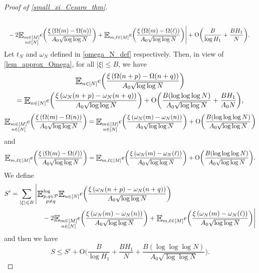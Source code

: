 \documentclass[letter,11pt]{article}
\theoremstyle{plain} %
\theoremstyle{definition} %
\theoremstyle{plain}
\theoremstyle{plain}
\theoremstyle{plain}
\numberwithin{equation}{section}
\newcommand{\Oh}{{\mathrm O}}
\renewcommand{\leq}{\leqslant}
\newcommand{\E}{\raisebox{-0.4ex}{\scalebox{1.4}[1.3]{$\mathbb{E}$}}}
\newcommand{\Esub}[1]{\raisebox{-0.4ex}{\scalebox{1.4}[1.3]{$\mathbb{E}$}}\raisebox{-0.35ex}{\ensuremath{_{\scriptstyle #1}}}}
\newcommand{\logE}{{\E}^{\log}}
\newcommand{\1}{\mathbbm{1}}
\newcommand{\Pc}{\mathcal{P}}
\begin{document}
\begin{proof}[Proof of \cref{small_xi_Cesaro_thm}]
\begin{align*}
\\
& \hspace*{0.2cm} - 2\Esub{\substack{m\in[M] \\ n\in[N]}}e\bigg(\frac{\xi\left(\Omega(m)-\Omega(n)\right)}{A_0\sqrt{\log\log{N}}}\bigg) + \Esub{m,\ell\in[M]} e\bigg(\frac{\xi \left(\Omega(m)-\Omega(\ell)\right)}{A_0 \sqrt{\log\log{N}}}\bigg)\Bigg|
+ \Oh\bigg(\frac{B}{\log H_1}+\frac{BH_1}{N}\bigg).
\end{align*}
Let $t_N$ and $\omega_N$ defined in \eqref{omega_N_def} respectively. Then, in view of \cref{lem_approx_Omega}, for all $|\xi|\leq B$, we have
\begin{multline*}
    \Esub{n\in[N]}e\bigg(\frac{\xi \left(\Omega(n+p)-\Omega(n+q)\right)}{A_0 \sqrt{\log\log{N}}}\bigg) \\
    = \Esub{n\in[N]}e\bigg(\frac{\xi \left(\omega_N(n+p)-\omega_N(n+q)\right)}{A_0 \sqrt{\log\log{N}}}\bigg)+\Oh\bigg(\frac{B(\log\log\log N)}{A_0\sqrt{\log\log{N}}}+\frac{BH_1}{A_0N}\bigg),
\end{multline*}
$$
\Esub{\substack{m\in[M] \\ n\in[N]}}e\bigg(\frac{\xi \left(\Omega(m)-\Omega(n)\right)}{A_0\sqrt{\log\log{N}}}\bigg)
=
\Esub{\substack{m\in[M] \\ n\in[N]}}e\bigg(\frac{\xi \left(\omega_N(m)-\omega_N(n)\right)}{A_0\sqrt{\log\log{N}}}\bigg)+\Oh\bigg(\frac{B(\log\log\log N)}{A_0\sqrt{\log\log{N}}}\bigg)$$
and
\[
\Esub{m,\ell\in[M]}e\bigg(\frac{\xi \left(\Omega(m)-\Omega(\ell)\right)}{A_0\sqrt{\log\log{N}}}\bigg)
=
\Esub{m,\ell\in[M]}e\bigg(\frac{\xi \left(\omega_N(m)-\omega_N(\ell)\right)}{A_0\sqrt{\log\log{N}}}\bigg)+\Oh\bigg(\frac{B(\log\log\log N)}{A_0\sqrt{\log\log{N}}}\bigg).
\]
We define 
\begin{align*}
    & S' = \sum_{|\xi|\leq B}\Bigg|\logE_{\substack{p,q\in\Pc \\ p\neq q}} \Esub{n\in[N]}e\bigg(\frac{\xi \left(\omega_N(n+p)-\omega_N(n+q)\right)}{A_0\sqrt{\log\log{N}}}\bigg) \\
    & \hspace*{2cm}
    - 2\Esub{\substack{m\in[M] \\ n\in[N]}}e\bigg(\frac{\xi\left(\omega_N(m)-\omega_N(n)\right)}{A_0\sqrt{\log\log{N}}}\bigg) + \Esub{m,\ell\in[M]} e\bigg(\frac{\xi \left(\omega_N(m)-\omega_N(\ell)\right)}{A_0 \sqrt{\log\log{N}}}\bigg)\Bigg|
\end{align*}
and then we have
\begin{equation}
\label{eqn_3to4}
S 
\leq S' + \Oh\bigg(\frac{B}{\log{H_1}} + \frac{BH_1}{N} + \frac{B(\log\log\log N)}{A_0\sqrt{\log\log{N}}}\bigg).
\end{equation}


\end{proof}
\end{document}
